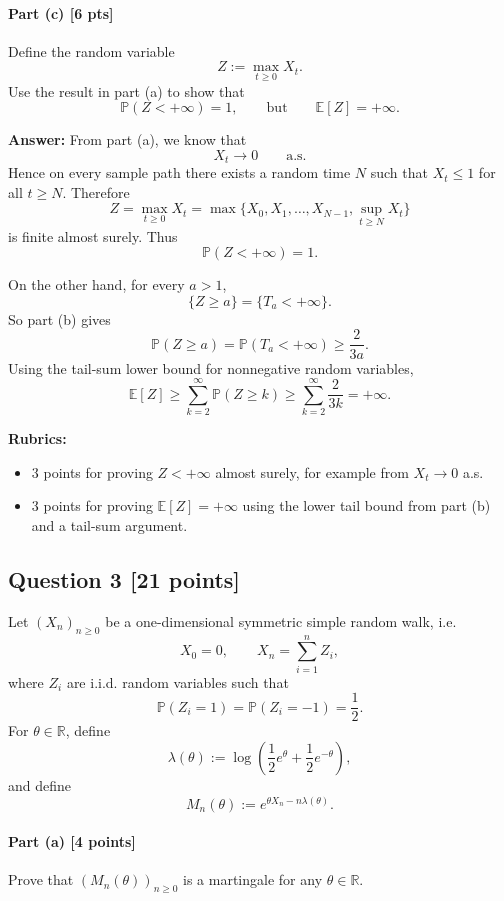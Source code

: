 \documentclass[11pt]{article}
\theoremstyle{definition}
\begin{document}
\paragraph{Part (c) \hfill [6 pts]}
Define the random variable
\[
Z:=\max_{t\ge 0} X_t.
\]
Use the result in part (a) to show that
\[
\mathbb P(Z<+\infty)=1,
\qquad
\text{but}
\qquad
\mathbb E[Z]=+\infty.
\]

\textbf{Answer:}
From part (a), we know that
\[
X_t\to 0
\qquad \text{a.s.}
\]
Hence on every sample path there exists a random time \(N\) such that \(X_t\le 1\) for all \(t\ge N\). Therefore
\[
Z
=
\max_{t\ge 0}X_t
=
\max\{X_0,X_1,\dots,X_{N-1},\sup_{t\ge N}X_t\}
\]
is finite almost surely. Thus
\[
\mathbb P(Z<+\infty)=1.
\]

On the other hand, for every \(a>1\),
\[
\{Z\ge a\}=\{T_a<+\infty\}.
\]
So part (b) gives
\[
\mathbb P(Z\ge a)=\mathbb P(T_a<+\infty)\ge \frac{2}{3a}.
\]
Using the tail-sum lower bound for nonnegative random variables,
\[
\mathbb E[Z]
\ge
\sum_{k=2}^\infty \mathbb P(Z\ge k)
\ge
\sum_{k=2}^\infty \frac{2}{3k}
=+\infty.
\]

\textbf{Rubrics:}
\begin{itemize}[leftmargin=2em]
    \item \(3\) points for proving \(Z<+\infty\) almost surely, for example from \(X_t\to 0\) a.s.
    \item \(3\) points for proving \(\mathbb E[Z]=+\infty\) using the lower tail bound from part (b) and a tail-sum argument.
\end{itemize}

\subsection*{Question 3 \hfill [21 points]}

Let \((X_n)_{n\ge 0}\) be a one-dimensional symmetric simple random walk, i.e.
\[
X_0=0,
\qquad
X_n=\sum_{i=1}^n Z_i,
\]
where \(Z_i\) are i.i.d. random variables such that
\[
\mathbb P(Z_i=1)=\mathbb P(Z_i=-1)=\frac12.
\]
For \(\theta\in \mathbb R\), define
\[
\lambda(\theta):=\log\left(\frac12 e^\theta+\frac12 e^{-\theta}\right),
\]
and define
\[
M_n(\theta):=e^{\theta X_n-n\lambda(\theta)}.
\]

\paragraph{Part (a) \hfill [4 points]}
Prove that \((M_n(\theta))_{n\ge 0}\) is a martingale for any \(\theta\in\mathbb R\).
\end{document}
